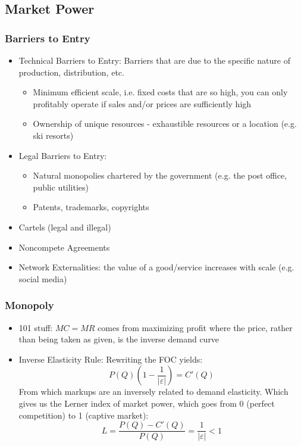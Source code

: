 \documentclass{article}
\newcommand{\blue}[1]{{\color{blue}#1}}
\begin{document}
\subsection{Market Power}

\subsubsection{Barriers to Entry}
\begin{itemize}
	\item Technical Barriers to Entry: Barriers that are due to the specific nature of production, distribution, etc.
		\begin{itemize}
			\item Minimum efficient scale, i.e. fixed costs that are so high, you can only profitably operate if sales and/or prices are sufficiently high
			\item Ownership of unique resources - exhaustible resources or a location (e.g. ski resorts)
		\end{itemize}
	\item Legal Barriers to Entry:
		\begin{itemize}
			\item Natural monopolies chartered by the government (e.g. the post office, public utilities)
			\item Patents, trademarks, copyrights
		\end{itemize}
	\item Cartels (legal and illegal)
	\item Noncompete Agreements
	\item Network Externalities: the value of a good/service increases with scale (e.g. social media)
\end{itemize}

\subsubsection{Monopoly}
\begin{itemize}
	\item 101 stuff: $MC=MR$ comes from maximizing profit where the price, rather than being taken as given, is the inverse demand curve
	\item \blue{Inverse Elasticity Rule:} Rewriting the FOC yields:
		\[
			P(Q)\left(1-\frac{1}{|\varepsilon|}\right) = C'(Q)
		\]
		From which markups are an inversely related to demand elasticity. Which gives us the \blue{Lerner index} of market power, which goes from 0 (perfect competition) to 1 (captive market):
		\[
			L = \frac{P(Q) - C'(Q)}{P(Q)} = \frac{1}{|\varepsilon|} < 1
		\]
\end{itemize}
\end{document}
